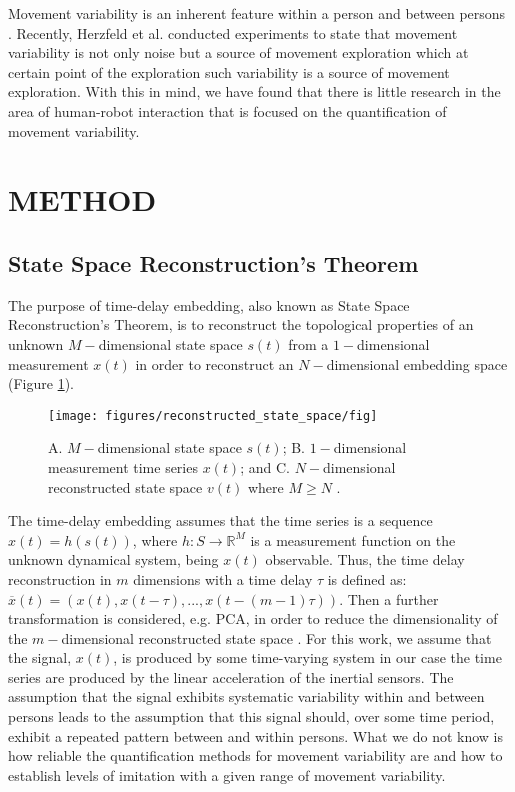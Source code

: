 \documentclass{sigchi}
\begin{document}
Movement variability is an inherent feature within a person and between persons
\cite{newell1993variability}. Recently, Herzfeld et al. \cite{Herzfeld2014}
conducted experiments to state that movement variability is not only noise but a
source of movement exploration which at certain point of the exploration
such variability is a source of movement exploration.
With this in mind, we have found that there is little research in the area of
human-robot interaction that is focused on the quantification of movement variability.


%
\section{METHOD}

\subsection{State Space Reconstruction's Theorem}
The purpose of time-delay embedding, also known as State Space Reconstruction's
Theorem, is to reconstruct the topological properties of an unknown $M-$dimensional
state space $s(t)$ from a $1-$dimensional measurement $x(t)$ in order to
reconstruct an $N-$dimensional embedding space (Figure \ref{fig:takens_theorem}).
\begin{figure}[!htb]
\centering
\texttt{[image: figures/reconstructed\_state\_space/fig]}
\caption[PA]{A. $M-$dimensional state space $s(t)$; B. $1-$dimensional measurement
time series $x(t)$; and  C. $N-$dimensional reconstructed state space $v(t)$ where $M \geq N$
\cite{QuintanaDuque2012}.}
\label{fig:takens_theorem}
\end{figure}
The time-delay embedding assumes that the time series is a sequence $x(t)=h(s(t))$,
where $h: S \rightarrow \mathbb{R}^M$ is a measurement function on the unknown
dynamical system, being $x(t)$ observable.
Thus, the time delay reconstruction in $m$ dimensions with a time delay
$\tau$ is defined as: $\overline{x}(t) = (x(t), x(t-\tau),...,x(t-(m-1)\tau))$.
Then a further transformation is considered, e.g. PCA, in order to reduce
the dimensionality of the $m-$dimensional reconstructed state space \cite{Uzal2011}.
For this work, we assume that the signal, $x(t)$, is produced by some time-varying
system in our case the time series are produced by the linear acceleration of
the inertial sensors.
The assumption that the signal exhibits systematic variability within and between
persons leads to the assumption that this signal should, over some time period,
exhibit a repeated pattern between and within persons. What we do not know is
how reliable the quantification methods for movement variability are and how
to establish levels of imitation with a given range of movement variability.
\end{document}
